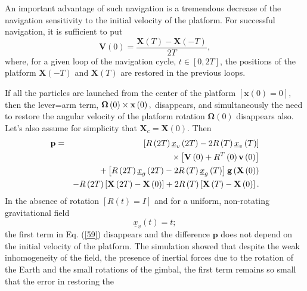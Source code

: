 \documentclass[twocolumn,showpacs,preprintnumbers]{revtex4}
\begin{document}
An important advantage of such navigation is a tremendous decrease of the
navigation sensitivity to the initial velocity of the platform. For
successful navigation, it is sufficient to put \cite{c11,c13}%
\begin{equation}
\mathbf{V}\left( 0\right) =\dfrac{\mathbf{X}\left( T\right) -\mathbf{X}%
\left( -T\right) }{2T},  \label{58}
\end{equation}%
where, for a given loop of the navigation cycle, $t\in \left[ 0,2T\right] $,
the positions of the platform $\mathbf{X}\left( -T\right) $ and $\mathbf{X}%
\left( T\right) $ are restored in the previous loops.

If all the particles are launched from the center of the platform $\left[ 
\mathbf{x}\left( 0\right) =0\right] ,$ then the lever=arm term, $\mathbf{%
\Omega }\left( 0\right) \times \mathbf{x}\left( 0\right) ,$ disappears, and
simultaneously the need to restore the angular velocity of the platform
rotation $\mathbf{\Omega }\left( 0\right) $ disappears also. Let's also
assume for simplicity that $\mathbf{X}_{c}=\mathbf{X}\left( 0\right) $. Then%
\begin{eqnarray}
\mathbf{p} &=&\left[ R\left( 2T\right) \underline{x}_{v}\left( 2T\right)
-2R\left( T\right) \underline{x}_{v}\left( T\right) \right]  \notag \\
&&\times \left[ \mathbf{V}\left( 0\right) +R^{T}\left( 0\right) \mathbf{v}%
\left( 0\right) \right]  \notag \\
&&+\left[ R\left( 2T\right) \underline{x}_{g}\left( 2T\right) -2R\left(
T\right) \underline{x}_{g}\left( T\right) \right] \mathbf{g}\left( \mathbf{X}%
\left( 0\right) \right)  \notag \\
&&-R\left( 2T\right) \left[ \mathbf{X}\left( 2T\right) -\mathbf{X}\left(
0\right) \right] +2R\left( T\right) \left[ \mathbf{X}\left( T\right) -%
\mathbf{X}\left( 0\right) \right] .  \label{59}
\end{eqnarray}%
In the absence of rotation $\left[ R\left( t\right) =I\right] $ and for a
uniform, non-rotating gravitational field%
\begin{equation}
\underline{x}_{v}\left( t\right) =t;  \label{60}
\end{equation}%
the first term in Eq. (\ref{59}) disappears and the difference $\mathbf{p}$
does not depend on the initial velocity of the platform. The simulation
showed that despite the weak inhomogeneity of the field, the presence of
inertial forces due to the rotation of the Earth and the small rotations of
the gimbal, the first term remains so small that the error in restoring the
\end{document}
